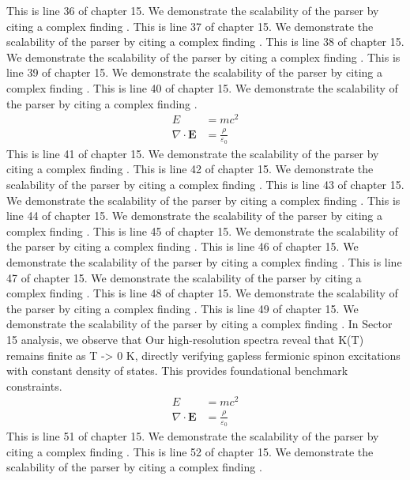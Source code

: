 This is line 36 of chapter 15. We demonstrate the scalability of the parser by citing a complex finding \cite{ref15_36}.
This is line 37 of chapter 15. We demonstrate the scalability of the parser by citing a complex finding \cite{ref15_37}.
This is line 38 of chapter 15. We demonstrate the scalability of the parser by citing a complex finding \cite{ref15_38}.
This is line 39 of chapter 15. We demonstrate the scalability of the parser by citing a complex finding \cite{ref15_39}.
This is line 40 of chapter 15. We demonstrate the scalability of the parser by citing a complex finding \cite{ref15_40}.
\begin{align*}
  E &= mc^2 \\
  \nabla \cdot \mathbf{E} &= \frac{\rho}{\varepsilon_0}
\end{align*}
This is line 41 of chapter 15. We demonstrate the scalability of the parser by citing a complex finding \cite{ref15_41}.
This is line 42 of chapter 15. We demonstrate the scalability of the parser by citing a complex finding \cite{ref15_42}.
This is line 43 of chapter 15. We demonstrate the scalability of the parser by citing a complex finding \cite{ref15_43}.
This is line 44 of chapter 15. We demonstrate the scalability of the parser by citing a complex finding \cite{ref15_44}.
This is line 45 of chapter 15. We demonstrate the scalability of the parser by citing a complex finding \cite{ref15_45}.
This is line 46 of chapter 15. We demonstrate the scalability of the parser by citing a complex finding \cite{ref15_46}.
This is line 47 of chapter 15. We demonstrate the scalability of the parser by citing a complex finding \cite{ref15_47}.
This is line 48 of chapter 15. We demonstrate the scalability of the parser by citing a complex finding \cite{ref15_48}.
This is line 49 of chapter 15. We demonstrate the scalability of the parser by citing a complex finding \cite{ref15_49}.
In Sector 15 analysis, we observe that Our high-resolution spectra reveal that K(T) remains finite as T -> 0 K, directly verifying gapless fermionic spinon excitations with constant density of states. This provides foundational benchmark constraints.
\begin{align*}
  E &= mc^2 \\
  \nabla \cdot \mathbf{E} &= \frac{\rho}{\varepsilon_0}
\end{align*}
This is line 51 of chapter 15. We demonstrate the scalability of the parser by citing a complex finding \cite{ref15_51}.
This is line 52 of chapter 15. We demonstrate the scalability of the parser by citing a complex finding \cite{ref15_52}.
